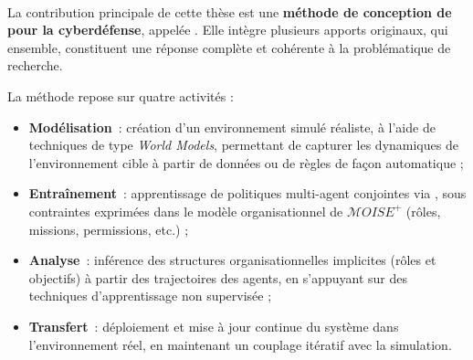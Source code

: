 \\

La contribution principale de cette thèse est une \textbf{méthode de conception de  pour la cyberdéfense}, appelée . Elle intègre plusieurs apports originaux, qui ensemble, constituent une réponse complète et cohérente à la problématique de recherche.

La méthode repose sur quatre activités :
\begin{itemize}
    \item \textbf{Modélisation}~: création d'un environnement simulé réaliste, à l'aide de techniques de type \textit{World Models}, permettant de capturer les dynamiques de l'environnement cible à partir de données ou de règles de façon automatique ;
    \item \textbf{Entraînement}~: apprentissage de politiques multi-agent conjointes via , sous contraintes exprimées dans le modèle organisationnel de $\mathcal{M}OISE^+$ (rôles, missions, permissions, etc.) ;
    \item \textbf{Analyse}~: inférence des structures organisationnelles implicites (rôles et objectifs) à partir des trajectoires des agents, en s'appuyant sur des techniques d'apprentissage non supervisée ;
    \item \textbf{Transfert}~: déploiement et mise à jour continue du système dans l'environnement réel, en maintenant un couplage itératif avec la simulation.
\end{itemize}

